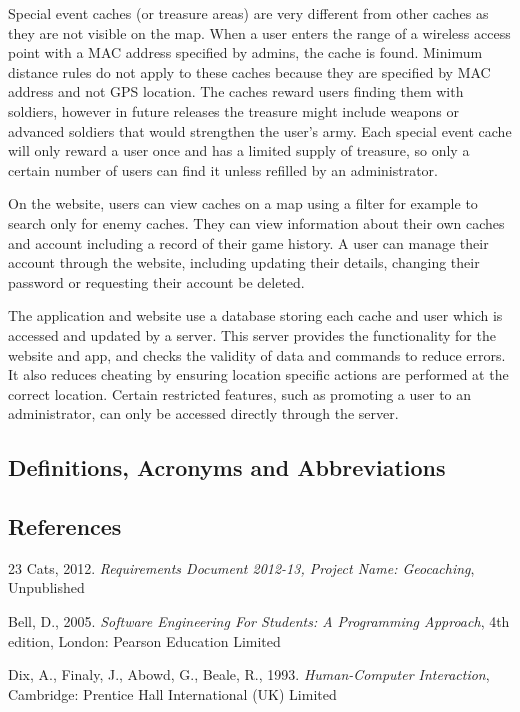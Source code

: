 Special event caches (or treasure areas) are very different from other caches as they are not visible on the map. When a user enters the range of a wireless access point with a MAC address specified by admins, the cache is found. Minimum distance rules do not apply to these caches because they are specified by MAC address and not GPS location. The caches reward users finding them with soldiers, however in future releases the treasure might include weapons or advanced soldiers that would strengthen the user’s army. Each special event cache will only reward a user once and has a limited supply of treasure, so only a certain number of users can find it unless refilled by an administrator.

On the website, users can view caches on a map using a filter for example to search only for enemy caches. They can view information about their own caches and account including a record of their game history. A user can manage their account through the website, including updating their details, changing their password or requesting their account be deleted.

The application and website use a database storing each cache and user which is accessed and updated by a server. This server provides the functionality for the website and app, and checks the validity of data and commands to reduce errors. It also reduces cheating by ensuring location specific actions are performed at the correct location. Certain restricted features, such as promoting a user to an administrator, can only be accessed directly through the server.

\subsection{Definitions, Acronyms and Abbreviations}

\subsection{References}

23 Cats, 2012. \emph{Requirements Document 2012-13, Project Name: Geocaching}, Unpublished

Bell, D., 2005. \emph{Software Engineering For Students: A Programming Approach}, 4th edition, London: Pearson Education Limited

Dix, A., Finaly, J., Abowd, G., Beale, R., 1993. \emph{Human-Computer Interaction}, Cambridge: Prentice Hall International (UK) Limited

